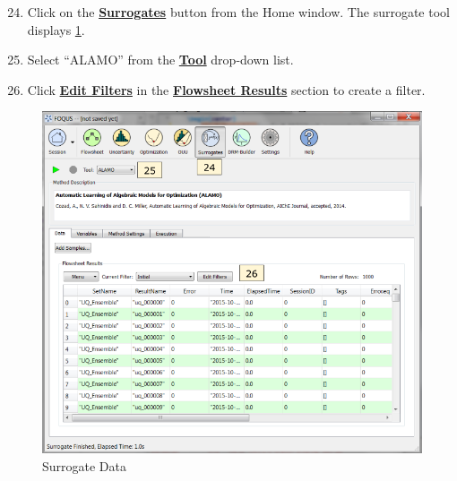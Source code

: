 \begin{enumerate}
	\setcounter{enumi}{23}
	\item Click on the \textbf{\underline{Surrogates}} button from the Home window. The surrogate tool displays \ref{fig.tut.sur.data}.
	\item Select ``ALAMO'' from the \textbf{\underline{Tool}} drop-down list.
	\item Click \textbf{\underline{Edit Filters}} in the \textbf{\underline{Flowsheet Results}} section to create a filter.
\end{enumerate} 
\begin{figure}[H]
	\begin{center}
		\includegraphics[scale=0.55]{Chapt_surrogates/figs/data}
		\caption{Surrogate Data}
		\label{fig.tut.sur.data}
	\end{center}
\end{figure}

